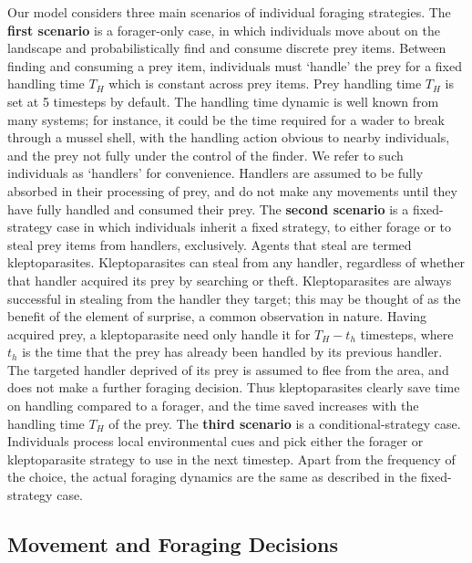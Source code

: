 \documentclass[11pt]{article}
\begin{document}
Our model considers three main scenarios of individual foraging strategies.
The \textbf{first scenario} is a forager-only case, in which individuals move about on the landscape and probabilistically find and consume discrete prey items.
Between finding and consuming a prey item, individuals must `handle' the prey for a fixed handling time $T_H$ which is constant across prey items.
Prey handling time $T_H$ is set at 5 timesteps by default.
The handling time dynamic is well known from many systems; for instance, it could be the time required for a wader to break through a mussel shell, with the handling action obvious to nearby individuals, and the prey not fully under the control of the finder.
We refer to such individuals as `handlers' for convenience.
Handlers are assumed to be fully absorbed in their processing of prey, and do not make any movements until they have fully handled and consumed their prey.
The \textbf{second scenario} is a fixed-strategy case in which individuals inherit a fixed strategy, to either forage or to steal prey items from handlers, exclusively.
Agents that steal are termed kleptoparasites.
Kleptoparasites can steal from any handler, regardless of whether that handler acquired its prey by searching or theft.
Kleptoparasites are always successful in stealing from the handler they target; this may be thought of as the benefit of the element of surprise, a common observation in nature.
Having acquired prey, a kleptoparasite need only handle it for $T_H - t_h$ timesteps, where $t_h$ is the time that the prey has already been handled by its previous handler.
The targeted handler deprived of its prey is assumed to flee from the area, and does not make a further foraging decision.
Thus kleptoparasites clearly save time on handling compared to a forager, and the time saved increases with the handling time $T_H$ of the prey.
The \textbf{third scenario} is a conditional-strategy case.
Individuals process local environmental cues and pick either the forager or kleptoparasite strategy to use in the next timestep.
Apart from the frequency of the choice, the actual foraging dynamics are the same as described in the fixed-strategy case.

\subsection{Movement and Foraging Decisions}
\end{document}
